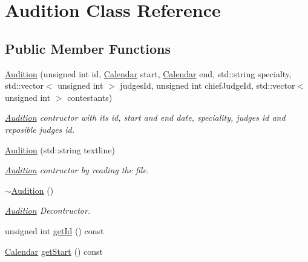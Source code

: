 \hypertarget{class_audition}{}\section{Audition Class Reference}
\label{class_audition}
\subsection*{Public Member Functions}
\begin{DoxyCompactItemize}
\item 
\hyperlink{class_audition_aba9121b34d5f4064cefee6afa099bfa8}{Audition} (unsigned int id, \hyperlink{class_calendar}{Calendar} start, \hyperlink{class_calendar}{Calendar} end, std\+::string specialty, std\+::vector$<$ unsigned int $>$ judges\+Id, unsigned int chief\+Judge\+Id, std\+::vector$<$ unsigned int $>$ contestants)
\begin{DoxyCompactList}\small\item\em \hyperlink{class_audition}{Audition} contructor with its id, start and end date, speciality, judges\textquotesingle{} id and reposible judge\textquotesingle{}s id. \end{DoxyCompactList}\item 
\mbox{\label{class_audition_aac285f2a39b091a92f86f221f2e4f040}} 
\hyperlink{class_audition_aac285f2a39b091a92f86f221f2e4f040}{Audition} (std\+::string textline)
\begin{DoxyCompactList}\small\item\em \hyperlink{class_audition}{Audition} contructor by reading the file. \end{DoxyCompactList}\item 
\mbox{\label{class_audition_a832a8c4db2225a54852546bae369b7d8}} 
\hyperlink{class_audition_a832a8c4db2225a54852546bae369b7d8}{$\sim$\+Audition} ()
\begin{DoxyCompactList}\small\item\em \hyperlink{class_audition}{Audition} Decontructor. \end{DoxyCompactList}\item 
unsigned int \hyperlink{class_audition_a938690d2670e525b808a6ba4aa485877}{get\+Id} () const
\item 
\hyperlink{class_calendar}{Calendar} \hyperlink{class_audition_ac4fc745ecaa9e6975dab7ed779d732d0}{get\+Start} () const
\item 

\end{DoxyCompactItemize}
